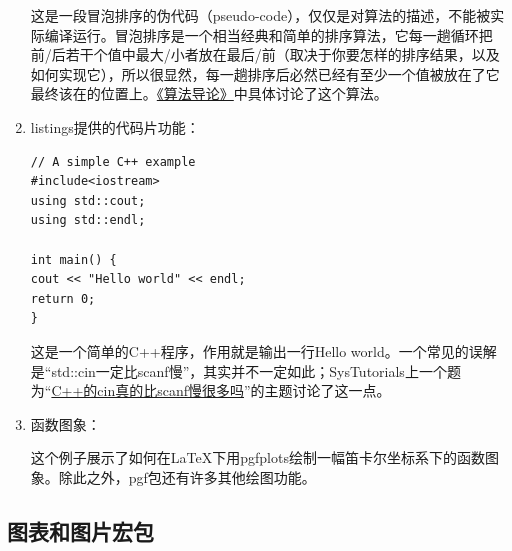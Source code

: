 \begin{enumerate}
这是一段冒泡排序的伪代码（pseudo-code），仅仅是对算法的描述，不能被实际编译运行。冒泡排序是一个相当经典和简单的排序算法，它每一趟循环把前/后若干个值中最大/小者放在最后/前（取决于你要怎样的排序结果，以及如何实现它），所以很显然，每一趟排序后必然已经有至少一个值被放在了它最终该在的位置上。\href{https://labs.xjtudlc.com/labs/wldmt/reading\%20list/books/Algorithms\%20and\%20optimization/Introduction\%20to\%20Algorithms.pdf}{《算法导论》}中具体讨论了这个算法。

\item listings提供的代码片功能：

\begin{lstlisting}[style = GNU_Cpp20_DevCpp]
// A simple C++ example
#include<iostream>
using std::cout;
using std::endl;

int main() {
cout << "Hello world" << endl;
return 0;
}
\end{lstlisting}

这是一个简单的C++程序，作用就是输出一行Hello world。一个常见的误解是“std::cin一定比scanf慢”，其实并不一定如此；SysTutorials上一个题为“\href{https://www.systutorials.com/is-cin-much-slower-than-scanf-in-c/}{C++的cin真的比scanf慢很多吗}”的主题讨论了这一点。

\item 函数图象：

\begin{figure}[H]
	\centering
\end{figure}

这个例子展示了如何在\LaTeX 下用pgfplots绘制一幅笛卡尔坐标系下的函数图象。除此之外，pgf包还有许多其他绘图功能。

\end{enumerate}

\renewcommand{\thefootnote}{\arabic{footnote}}

\subsection{图表和图片宏包}

